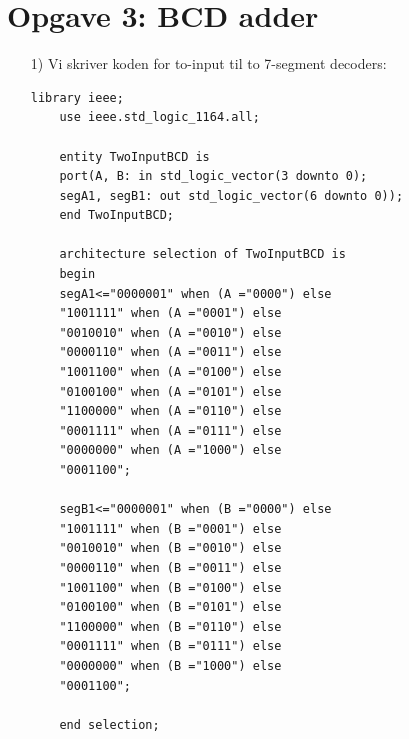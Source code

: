 \section{Opgave 3: BCD adder}
\begin{enumerate}
	\item[1)]
	Vi skriver koden for to-input til to 7-segment decoders:
		\begin{lstlisting}[caption={To-input til to 7 segment decoder},label={lst:TwoBcdToTwo7SegDecoder}]
	library ieee;
	use ieee.std_logic_1164.all;
	
	entity TwoInputBCD is
	port(A, B: in std_logic_vector(3 downto 0);
	segA1, segB1: out std_logic_vector(6 downto 0));
	end TwoInputBCD;
	
	architecture selection of TwoInputBCD is
	begin
	segA1<="0000001" when (A ="0000") else
	"1001111" when (A ="0001") else
	"0010010" when (A ="0010") else
	"0000110" when (A ="0011") else
	"1001100" when (A ="0100") else
	"0100100" when (A ="0101") else
	"1100000" when (A ="0110") else
	"0001111" when (A ="0111") else
	"0000000" when (A ="1000") else
	"0001100";
	
	segB1<="0000001" when (B ="0000") else
	"1001111" when (B ="0001") else
	"0010010" when (B ="0010") else
	"0000110" when (B ="0011") else
	"1001100" when (B ="0100") else
	"0100100" when (B ="0101") else
	"1100000" when (B ="0110") else
	"0001111" when (B ="0111") else
	"0000000" when (B ="1000") else
	"0001100";
	
	end selection;
		\end{lstlisting}
	

\end{enumerate}
